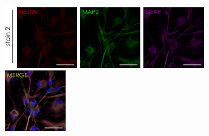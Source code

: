 \documentclass[onecolumn,10pt]{asme2ej}
\begin{document}
\begin{figure}[h]
	\includegraphics[width=0.035\textwidth]{figures/IF/charac(light)/stain2}
	\includegraphics[width=0.235\textwidth]{figures/IF/charac(light)/NESTIN(14)GFAP}
	\includegraphics[width=0.235\textwidth]{figures/IF/charac(light)/MAP2(14)GFAP}
	\includegraphics[width=0.235\textwidth]{figures/IF/charac(light)/GFAP(14)GFAP}
	\includegraphics[width=0.235\textwidth]{figures/IF/charac(light)/MERGE(14)GFAP}
	

\end{figure}
\end{document}
